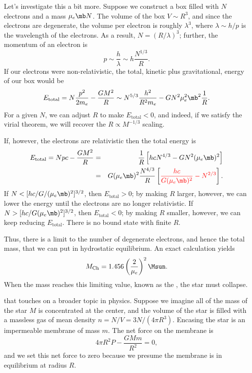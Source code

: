 Let's investigate this a bit more.  Suppose we construct a box filled with $N$ electrons and a mass $\mu_{e}\mb N$.  The volume of the box $V \sim R^{3}$, and since the electrons are degenerate, the volume per electron is roughly $\lambda^{3}$, where $\lambda \sim h/p$ is the wavelength of the electrons.  As a result, $N = (R/\lambda)^{3}$; further, the momentum of an electron is
\[	p \sim \frac{h}{\lambda} \sim h\frac{N^{1/3}}{R}. \]
If our electrons were non-relativistic, the total, kinetic plus gravitational, energy of our box would be
\[
	E_{\mathrm{total}} = N\frac{p^{2}}{2m_{e}} - \frac{GM^{2}}{R} \sim N^{5/3}\frac{h^{2}}{R^{2}m_{e}} - GN^{2}\mu_{e}^{2}\mb^{2} \frac{1}{R}.
\]
For a given $N$, we can adjust $R$ to make $E_{\mathrm{total}}<0$, and indeed, if we satisfy the virial theorem, we will recover the $R\propto M^{-1/3}$ scaling.

If, however, the electrons are relativistic then the total energy is
\begin{eqnarray*}
	E_{\mathrm{total}} = Npc - \frac{GM^{2}}{R} 
		&=& \frac{1}{R}\left[hc N^{4/3} - G N^{2}(\mu_{e}\mb)^{2}\right]\\
		&=& G(\mu_{e}\mb)^{2}\frac{N^{4/3}}{R}\left[ {\color{red}\frac{hc}{G(\mu_{e}\mb)^{2}} - N^{2/3}}\right].
\end{eqnarray*}
If $N < [hc/G/(\mu_{e}\mb)^{2}]^{3/2}$, then $E_{\mathrm{total}} > 0$; by making $R$ larger, however, we can lower the energy until the electrons are no longer relativistic.  If $N > [hc/G(\mu_{e}\mb)^{2}]^{3/2}$, then $E_{\mathrm{total}} < 0$; by making $R$ smaller, however, we can keep reducing $E_{\mathrm{total}}$.  There is no bound state with finite $R$.

Thus, there is a limit to the number of degenerate electrons, and hence the total mass, that we can put in hydrostatic equilibrium.  An exact calculation yields
\begin{equation}\label{e.Chandrasekhar}
	M_{\mathrm{Ch}} = 1.456 \left(\frac{2}{\mu_{e}}\right)^{2}\Msun.
\end{equation}
When the mass reaches this limiting value, known as the , the star must collapse.  

\cite{Cox1980Theory-of-Stell} that touches on a broader topic in physics.  Suppose we imagine all of the mass of the star $M$ is concentrated at the center, and the volume of the star is filled with a massless gas of mean density $n = N/V = 3N/(4\pi R^{3})$. Encasing the star is an impermeable membrane of mass $m$.  The net force on the membrane is
\begin{equation}\label{e.force}
	4\pi R^{2} P - \frac{GMm}{R^{2}} = 0,
\end{equation}
and we set this net force to zero because we presume the membrane is in equilibrium at radius $R$.

